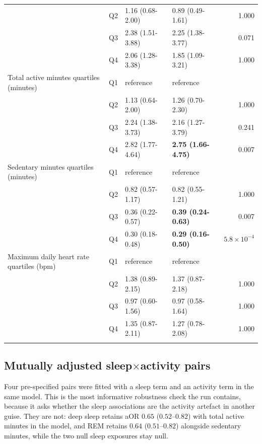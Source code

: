 \documentclass[11pt]{article}
\begin{document}
\begin{longtable}{@{}p{5.2cm}c p{3.0cm} p{3.0cm} r@{}}
 & Q2 & 1.16 (0.68-2.00) & 0.89 (0.49-1.61) & 1.000 \\
 & Q3 & 2.38 (1.51-3.88) & 2.25 (1.38-3.77) & 0.071 \\
 & Q4 & 2.06 (1.28-3.38) & 1.85 (1.09-3.21) & 1.000 \\
\addlinespace
Total active minutes quartiles (minutes) & Q1 & reference & reference & \\
 & Q2 & 1.13 (0.64-2.00) & 1.26 (0.70-2.30) & 1.000 \\
 & Q3 & 2.24 (1.38-3.73) & 2.16 (1.27-3.79) & 0.241 \\
 & Q4 & 2.82 (1.77-4.64) & \textbf{2.75 (1.66-4.75)} & 0.007 \\
\addlinespace
Sedentary minutes quartiles (minutes) & Q1 & reference & reference & \\
 & Q2 & 0.82 (0.57-1.17) & 0.82 (0.55-1.21) & 1.000 \\
 & Q3 & 0.36 (0.22-0.57) & \textbf{0.39 (0.24-0.63)} & 0.007 \\
 & Q4 & 0.30 (0.18-0.48) & \textbf{0.29 (0.16-0.50)} & $5.8\times10^{-4}$ \\
\addlinespace
Maximum daily heart rate quartiles (bpm) & Q1 & reference & reference & \\
 & Q2 & 1.38 (0.89-2.15) & 1.37 (0.87-2.18) & 1.000 \\
 & Q3 & 0.97 (0.60-1.56) & 0.97 (0.58-1.64) & 1.000 \\
 & Q4 & 1.35 (0.87-2.11) & 1.27 (0.78-2.08) & 1.000 \\
\addlinespace
\bottomrule \end{longtable}

\subsection{Mutually adjusted sleep\texorpdfstring{$\times$}{x}activity pairs}
\label{sec:res-mutual}
Four pre-specified pairs were fitted with a sleep term and an activity term in the same model. This
is the most informative robustness check the run contains, because it asks whether the sleep
associations are the activity artefact in another guise. They are not: deep sleep retains
aOR $0.65$ ($0.52$--$0.82$) with total active minutes in the model, and REM retains $0.64$
($0.51$--$0.82$) alongside sedentary minutes, while the two null sleep exposures stay null.
\end{document}
